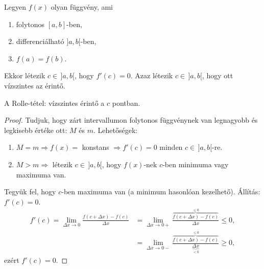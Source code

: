 \documentclass[11pt]{article}
\begin{document}
\begin{thmbox}
\begin{theorem}
Legyen $f(x)$ olyan függvény, ami
\begin{enumerate}[label=\alph*)]
\item folytonos $[a, b]$-ben,
\item differenciálható $]a, b[$-ben,
\item $f(a)=f(b)$.
\end{enumerate}
Ekkor létezik $c\in\,]a, b[$, hogy $f'(c)=0$. Azaz létezik $c\in\,]a, b[$, hogy ott vízszintes az érintő.
\end{theorem}
\end{thmbox}

\begin{notefig}{A Rolle-tétel: vízszintes érintő a $c$ pontban.}
\end{notefig}

\begin{proof}
Tudjuk, hogy zárt intervallumon folytonos függvénynek van legnagyobb és legkisebb értéke ott: $M$ és $m$. Lehetőségek:
\begin{enumerate}[label=\arabic*.]
\item $M=m\Longrightarrow f(x)=$ konstans $\Longrightarrow f'(c)=0$ minden $c\in\,]a, b[$-re.
\item $M>m\Longrightarrow$ létezik $c\in\,]a, b[$, hogy $f(x)$-nek $c$-ben minimuma vagy maximuma van.
\end{enumerate}
Tegyük fel, hogy $c$-ben maximuma van (a minimum hasonlóan kezelhető). Állítás: $f'(c)=0$.
\begin{align*}
f'(c)=\lim_{\Delta x\to 0}\frac{f(c+\Delta x)-f(c)}{\Delta x}
&=\lim_{\Delta x\to 0+}\frac{\overset{\le 0}{\overbrace{f(c+\Delta x)-f(c)}}}{\Delta x}\le 0,\\
&=\lim_{\Delta x\to 0-}\frac{\overset{\le 0}{\overbrace{f(c+\Delta x)-f(c)}}}{\underset{<0}{\underbrace{\Delta x}}}\ge 0,
\end{align*}
ezért $f'(c)=0$.
\end{proof}
\end{document}
